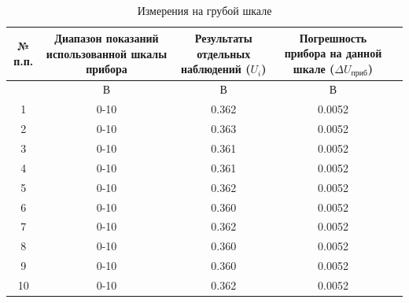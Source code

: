 \begin{table}[ht!]
\centering
\caption{Измерения на грубой шкале}
\label{tabl:1}
\begin{tabular}{|c|c|c|c|c|}
\hline
\begin{minipage}{7mm}
    № п.п. 
\end{minipage}&
\begin{minipage}{5cm}
    Диапазон показаний использованной шкалы прибора
\end{minipage} &
\begin{minipage}{5cm}
    Результаты отдельных наблюдений ($U_i$)
\end{minipage} &
\begin{minipage}{5cm}
    Погрешность прибора на данной шкале ($\Delta U_{\text{приб}}$)
\end{minipage}\\
\hline
{}&В&В&В\\
\hline
1 &	0-10  &	0.362 & 0.0052 \\
2 &	0-10  &	0.363	& 0.0052 \\
3 &	0-10  &	0.361	& 0.0052 \\
4 &	0-10  &	0.361 & 0.0052 \\
5 & 0-10  &	0.362 & 0.0052 \\
6 & 0-10  &	0.360 & 0.0052 \\
7 & 0-10  &	0.362 & 0.0052 \\
8 & 0-10  &	0.360 & 0.0052 \\
9 & 0-10  &	0.360 & 0.0052 \\
10& 0-10  &	0.362 & 0.0052 \\
\hline
\end{tabular}
\end{table}








